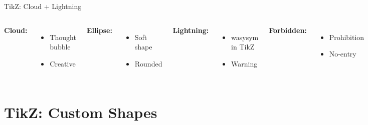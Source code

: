 \documentclass[10pt]{beamer}
\begin{document}
\begin{frame}{TikZ: Cloud + Lightning}
\begin{columns}
\textbf{Cloud:}
\begin{itemize}
  \item Thought bubble
  \item Creative
\end{itemize}

\textbf{Ellipse:}
\begin{itemize}
  \item Soft shape
  \item Rounded
\end{itemize}

\textbf{Lightning:}
\begin{itemize}
  \item wasysym in TikZ
  \item Warning
\end{itemize}

\textbf{Forbidden:}
\begin{itemize}
  \item Prohibition
  \item No-entry
\end{itemize}
\end{columns}
\end{frame}

\section{TikZ: Custom Shapes}
\end{document}
